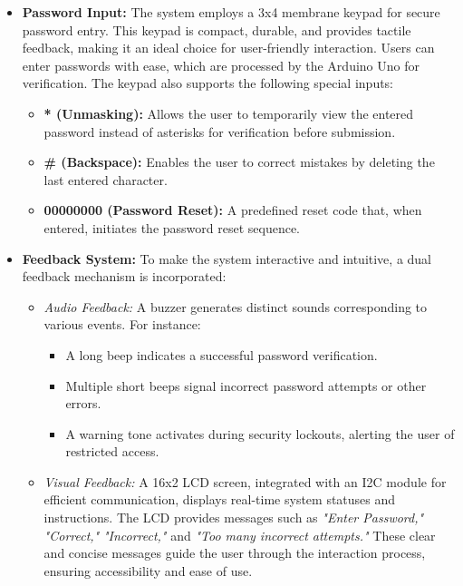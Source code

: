 \documentclass[a4paper, 12pt]{article}
\begin{document}
\begin{itemize}
    \item \textbf{Password Input:} 
    The system employs a 3x4 membrane keypad for secure password entry. This keypad is compact, durable, and provides tactile feedback, making it an ideal choice for user-friendly interaction. Users can enter passwords with ease, which are processed by the Arduino Uno for verification. The keypad also supports the following special inputs:
    \begin{itemize}
        \item \textbf{* (Unmasking):} Allows the user to temporarily view the entered password instead of asterisks for verification before submission.
        \item \textbf{\# (Backspace):} Enables the user to correct mistakes by deleting the last entered character.
        \item \textbf{00000000 (Password Reset):} A predefined reset code that, when entered, initiates the password reset sequence.
    \end{itemize}

    \item \textbf{Feedback System:} 
    To make the system interactive and intuitive, a dual feedback mechanism is incorporated:
    \begin{itemize}
        \item \textit{Audio Feedback:} A buzzer generates distinct sounds corresponding to various events. For instance:
        \begin{itemize}
            \item A long beep indicates a successful password verification.
            \item Multiple short beeps signal incorrect password attempts or other errors.
            \item A warning tone activates during security lockouts, alerting the user of restricted access.
        \end{itemize}
        \item \textit{Visual Feedback:} A 16x2 LCD screen, integrated with an I2C module for efficient communication, displays real-time system statuses and instructions. The LCD provides messages such as \textit{"Enter Password,"} \textit{"Correct,"} \textit{"Incorrect,"} and \textit{"Too many incorrect attempts."} These clear and concise messages guide the user through the interaction process, ensuring accessibility and ease of use.
    \end{itemize}


\end{itemize}
\end{document}
